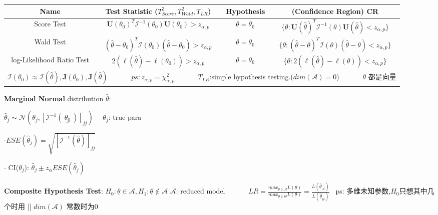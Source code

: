 \documentclass[9pt]{article}
\begin{document}
\begin{minipage}[t]{0.78\linewidth}
\vspace{-0.6cm}
\begin{longtable}{|c|c|c|c|}
    \hline
    Name & Test Statistic ({\small $T^2_{Score},T^2_{Wald},T_{LR}$}) & {\scriptsize Hypothesis} & (Confidence Region) CR \\
    \hline
    Score Test & $\mathbf{U}(\theta_0)^T\mathbf{\mathcal{I}}^{-1}(\theta_0)\mathbf{U}(\theta_0)>z_{\alpha,p}$ & $\theta=\theta_0$ & $\{\theta:\mathbf{U}(\widehat{\theta})^T\mathbf{\mathcal{I}}^{-1}(\theta)\mathbf{U}(\widehat{\theta})< z_{\alpha,p}\}$ \\
    \hline
    Wald Test & $(\widehat{\theta}-\theta_0)^T\mathbf{\mathcal{I}}(\theta_0)(\widehat{\theta}-\theta_0)>z_{\alpha,p}$ & $\theta=\theta_0$ & $\{\theta:(\widehat{\theta}-\theta)^T\mathbf{\mathcal{I}}(\theta)(\widehat{\theta}-\theta)<z_{\alpha,p}\}$ \\
    \hline
    {\scriptsize {\tiny log-}Likelihood Ratio Test} & $2(\ell(\widehat{\theta})-\ell(\theta_0))>z_{\alpha,p}$ & $\theta=\theta_0$ & $\{\theta:2(\ell(\widehat{\theta})-\ell(\theta))<z_{\alpha,p}\}$ \\
    \hline
    \multicolumn{4}{|c|}{{\scriptsize $\mathbf{\mathcal{I}}(\theta_0)\approx\mathbf{\mathcal{I}}(\widehat{\theta}),\mathbf{J}(\theta_0),\mathbf{J}(\widehat{\theta})$} \ \ \ \ \ \ $ps:z_{\alpha,p}=\chi^2_{\alpha,p}$ \ \ \ \ \ \ {\footnotesize $T_{LR}$:simple hypothesis testing.($dim(\mathcal{A})=0$)} \ \ \ \ \ \ $\theta$ {\footnotesize 都是向量}} \\
    \hline
\end{longtable}
\end{minipage}
\begin{minipage}[t]{0.22\linewidth}
    {\scriptsize \textbf{Marginal Normal} distribution $\widehat{\theta}$}:

    {\footnotesize $\widehat{\theta}_j\sim\mathcal{N}(\theta_j,[\mathbf{\mathcal{I}}^{-1}( \ \underline{\theta_0} \ )]_{jj})$} \ \ {\tiny $\theta_j$: true para}

    {\footnotesize $\cdot ESE(\widehat{\theta}_j)=\sqrt{[\mathbf{\mathcal{I}}^{-1}(\widehat{\theta})]_{jj}}$}

    {\footnotesize $\cdot$ CI($\theta_j$): $\widehat{\theta}_j\pm z_{\alpha}ESE(\widehat{\theta}_j)$}

\end{minipage}

\textbf{Composite Hypothesis Test}: {\small $H_0:\underline{\theta}\in\mathcal{A},H_1:\underline{\theta}\notin\mathcal{A}$} {\footnotesize $\mathcal{A}$: reduced model} \ \ \ \ \ \ {\small $LR=\frac{max_{\underline{\theta}\in\mathcal{A}}L(\underline{\theta})}{max_{\underline{\theta}\in\mathcal{\Theta}}L(\underline{\theta})}=\frac{L(\widehat{\underline{\theta}}_{\mathcal{A}})}{L(\widehat{\underline{\theta}}_\Theta)}$} \ {\tiny ps: 多维未知参数,$H_0$只想其中几个时用 || $dim(\mathcal{A})$ 常数时为0}
\end{document}
